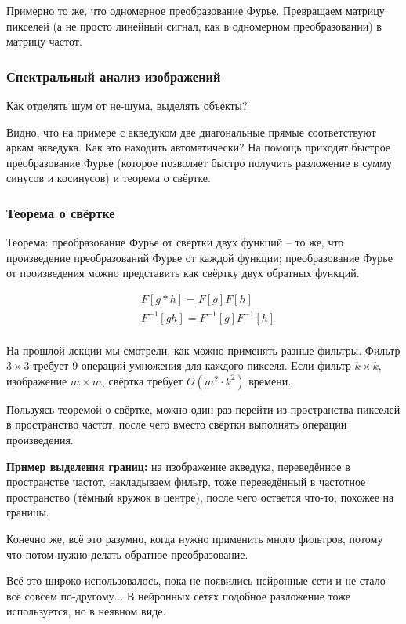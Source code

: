 \documentclass[main.tex]{subfiles}
\begin{document}
Примерно то же, что одномерное преобразование Фурье.
Превращаем матрицу пикселей (а не просто линейный сигнал, как в одномерном преобразовании) в матрицу частот.

\subsubsection{Спектральный анализ изображений}
Как отделять шум от не-шума, выделять объекты?

Видно, что на примере с акведуком две диагональные прямые соответствуют аркам акведука.
Как это находить автоматически? На помощь приходят быстрое преобразование Фурье (которое позволяет быстро получить разложение в сумму синусов и косинусов) и теорема о свёртке.

\subsubsection{Теорема о свёртке} 

Теорема: преобразование Фурье от свёртки двух функций -- то же, что произведение преобразований Фурье от каждой функции; преобразование Фурье от произведения можно представить как свёртку двух обратных функций.

\begin{align*}
	& F[g*h] = F[g]F[h] \\
	& F^{-1}[gh] = F^{-1}[g] F^{-1}[h]\\
\end{align*}

На прошлой лекции мы смотрели, как можно применять разные фильтры.
Фильтр $ 3 \times 3 $ требует $ 9 $ операций умножения для каждого пикселя. Если фильтр $ k \times k $, изображение $ m \times m $, свёртка требует $ O(m^2 \cdot k^2) $ времени.

Пользуясь теоремой о свёртке, можно один раз перейти из пространства пикселей в пространство частот, после чего вместо свёртки выполнять операции произведения.

\textbf{Пример выделения границ:} на изображение акведука, переведённое в пространстве частот, накладываем фильтр, тоже переведённый в частотное пространство (тёмный кружок в центре), после чего остаётся что-то, похожее на границы.

Конечно же, всё это разумно, когда нужно применить много фильтров, потому что потом нужно делать обратное преобразование. 

Всё это широко использовалось, пока не появились нейронные сети и не стало всё совсем по-другому...
В нейронных сетях подобное разложение тоже используется, но в неявном виде.
\end{document}
